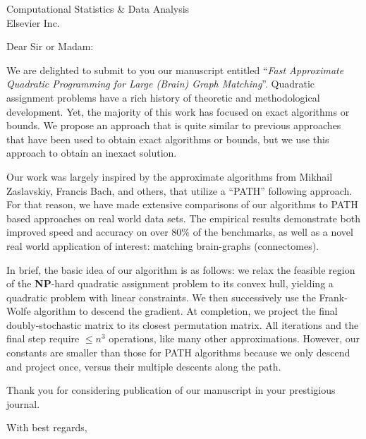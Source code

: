 \documentclass{letter}
\begin{document}
\begin{letter}{Computational Statistics \& Data Analysis \\ 
Elsevier Inc.}
	
	 
	
	  
	
\opening{Dear Sir or Madam:}

We are delighted to submit to you our manuscript entitled ``\emph{Fast Approximate Quadratic Programming for Large (Brain) Graph Matching}''.  Quadratic assignment problems have a rich history of theoretic and methodological development.  Yet, the majority of this work has focused on exact algorithms or bounds.  We propose an approach that is quite similar to previous approaches that have been used to obtain exact algorithms or bounds, but we use this approach to obtain an inexact solution. 

Our work was largely inspired by the approximate algorithms 
from Mikhail Zaslavskiy, Francis Bach, and others,
that utilize a ``PATH'' following approach. For that reason, we have made extensive comparisons of our algorithms to PATH based approaches on real world data sets.  The empirical results demonstrate both improved speed and accuracy on over $80\%$ of the benchmarks, as well as a novel real world application of interest: matching brain-graphs (connectomes).

In brief, the basic idea of our algorithm is as follows: we relax the feasible region of the \textbf{NP}-hard quadratic assignment problem to its convex hull, yielding a quadratic problem with linear constraints.  We then successively use the Frank-Wolfe algorithm to descend the gradient.  At completion, we project the final doubly-stochastic matrix to its closest permutation matrix.  All iterations and the final step require $\leq n^3$ operations, like many other approximations.  However, our constants are smaller than those for PATH algorithms because we only descend and project once, versus their multiple descents along the path.  

Thank you for considering publication of our manuscript in your prestigious journal.


\closing{With best regards,}

\end{letter}
\end{document}
